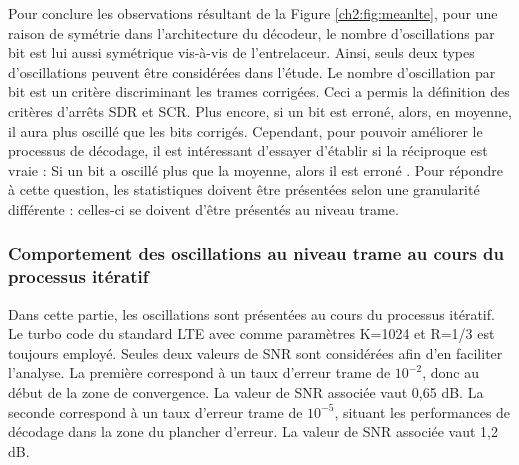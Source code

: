 Pour conclure les observations résultant de la Figure \ref{ch2:fig:meanlte}, pour une raison de symétrie dans l'architecture 
du décodeur, le nombre d'oscillations par bit est lui aussi symétrique vis-à-vis de l'entrelaceur. Ainsi, seuls deux types 
d'oscillations peuvent être considérées dans l'étude. Le nombre d’oscillation par bit est un critère discriminant les trames 
corrigées. Ceci a permis la définition des critères d'arrêts SDR et SCR. Plus encore, si un bit est erroné, alors, en moyenne, 
il aura plus oscillé que les bits corrigés. Cependant, pour pouvoir améliorer le processus de décodage, il est intéressant 
d'essayer d'établir si la réciproque est vraie : 
\og Si un bit a oscillé plus que la moyenne, alors il est erroné \fg. Pour répondre à cette question, les statistiques doivent
être présentées selon une granularité différente : celles-ci se doivent d'être présentés au niveau trame.

\subsubsection{Comportement des oscillations au niveau trame au cours du processus itératif} 
Dans cette partie, les oscillations sont présentées au cours du processus itératif. Le turbo code du standard LTE avec 
comme paramètres K=1024 et R=1/3 est toujours employé. Seules deux valeurs de SNR sont considérées afin d'en faciliter 
l'analyse. La première correspond à un taux d'erreur trame de $10^{-2}$, donc au début de la zone de convergence. La valeur 
de SNR associée vaut 0,65 dB. La seconde correspond à un taux d'erreur trame de $10^{-5}$, situant les performances de 
décodage dans la zone du plancher d'erreur. La valeur de SNR associée vaut 1,2 dB.

